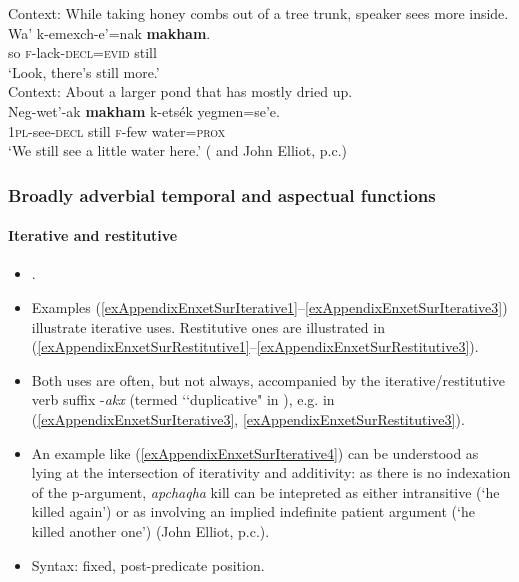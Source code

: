 \begin{exe}
	\ex Context: While taking honey combs out of a tree trunk, speaker sees more inside.\\
	\gll Wa’ k-emexch-e’=nak \textbf{makham}.\\ 
	so \textsc{f}-lack-\textsc{decl}=\textsc{evid} still\\
	\glt \lq Look, there’s still more.\rq{ }\parencite[325]{Elliot2021}\\

	\ex Context: About a larger pond that has mostly dried up.\\
	\gll Neg-wet’-ak \textbf{makham} k-etsék yegmen=se’e.\\
	1\textsc{pl}-see-\textsc{decl} still \textsc{f}-few water=\textsc{prox}\\
	\glt \lq We still see a little water here.\rq{ }(\cite[562]{Elliot2021} and John Elliot, p.c.)
\end{exe}

\subsubsection{Broadly adverbial temporal and aspectual functions}


\paragraph{Iterative and restitutive}
\label{appendixEnxetSurIterative}
\begin{itemize}
	\item \textcite[484]{Elliot2021}.
	\item Examples (\ref{exAppendixEnxetSurIterative1}–\ref{exAppendixEnxetSurIterative3}) illustrate iterative uses. Restitutive ones are illustrated in (\ref{exAppendixEnxetSurRestitutive1}–\ref{exAppendixEnxetSurRestitutive3}).
	\item Both uses are often, but not always, accompanied by the iterative/restitutive verb suffix \mbox{-\textit{akx}} (termed \lq\lq duplicative" in \cite{Elliot2021}), e.g. in 	(\ref{exAppendixEnxetSurIterative3}, \ref{exAppendixEnxetSurRestitutive3}).
	\item An example like (\ref{exAppendixEnxetSurIterative4}) can be understood as lying at the intersection of iterativity and additivity: as there is no indexation of the p-argument, \textit{apchaqha} kill can be intepreted as either intransitive (\lq he killed again') or as involving an implied indefinite patient argument (\lq he killed another one') (John Elliot, p.c.). 
	\item Syntax: fixed, post-predicate position.
\end{itemize}

